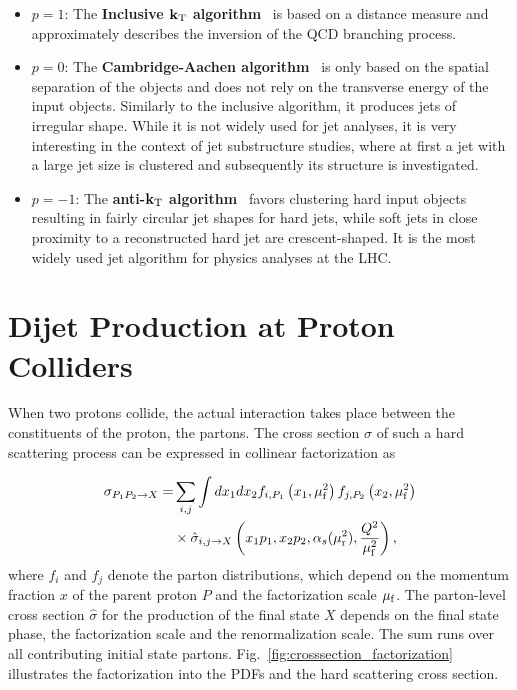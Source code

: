 \begin{itemize}
    \item $p=1$: The \textbf{Inclusive $\mathbf{k_{\mathrm{T}}}$
    algorithm}~\cite{Catani:1991hj,Catani:1992rm} is based on a \ptsq
        distance measure and approximately describes the inversion
        of the QCD branching process.
    \item $p=0$: The \textbf{Cambridge-Aachen
        algorithm}~\cite{Dokshitzer:1997in} is only based on the spatial
        separation of the objects and does not rely on the transverse energy of
        the input objects. Similarly to the inclusive \kt algorithm, it produces
        jets of irregular shape. While it is not widely used for jet analyses,
        it is very interesting in the context of jet substructure studies, where
        at first a jet with a large jet size is clustered and subsequently its
        structure is investigated.
    \item  $p=-1$: The \textbf{anti-$\mathbf{k_{\mathrm{T}}}$
    algorithm}~\cite{Cacciari:2008gp} favors clustering hard input objects
    resulting in fairly circular jet shapes for hard jets, while soft jets in
    close proximity to a reconstructed hard jet are crescent-shaped. It is the
    most widely used jet algorithm for physics analyses at the LHC.
\end{itemize}

\section{Dijet Production at Proton Colliders}

When two protons collide, the actual interaction takes place between the
constituents of the proton, the partons. The cross section $\sigma$ of such a hard
scattering process can be expressed in collinear factorization as

\begin{equation*}
    \begin{split}
    \sigma_{P_1 P_2 \rightarrow X} = &\sum_{i,j} \int dx_1 dx_2 f_{i, P_1}
    \left(x_1, \mu_{\mathrm{f}}^2 \right) f_{j,P_2} \left(x_2, \mu_{\mathrm{f}}^2 \right) \\ 
    &\times \hat\sigma_{i,j \rightarrow X} \left( x_1 p_1, x_2p_2, \alpha_{s}(\mu_{\mathrm{r}}^2),
    \frac{Q^2}{\mu_{\mathrm{f}}^2} \right),
\end{split}
\end{equation*}
%
where $f_i$ and $f_j$ denote the parton distributions, which depend on the
momentum fraction $x$ of the parent proton $P$ and the factorization scale
$\mu_{\mathrm{f}}$. The parton-level cross section $\hat \sigma$ for the production of the
final state $X$ depends on the final state phase, the factorization scale and
the renormalization scale. The sum runs over all contributing initial state
partons. Fig.~\ref{fig:crosssection_factorization} illustrates the factorization
into the PDFs and the hard scattering cross section.

